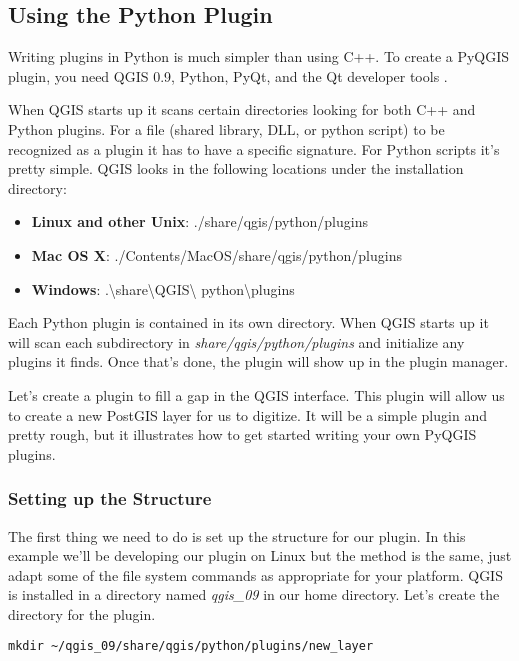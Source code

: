 \subsection{Using the Python Plugin}

Writing plugins in Python is much simpler than using C++. To create a PyQGIS
plugin, you need QGIS 0.9, Python, PyQt, and the Qt developer tools 
\cite{sherman07}.

When QGIS starts up it scans certain directories looking for both C++ and
Python plugins. For a file (shared library, DLL, or python script) to be
recognized as a plugin it has to have a specific signature. For Python scripts
it's pretty simple. QGIS looks in the following locations under the
installation directory:

\begin{itemize}
\item \textbf{Linux and other Unix}: ./share/qgis/python/plugins
\item \textbf{Mac OS X}: ./Contents/MacOS/share/qgis/python/plugins
\item \textbf{Windows}: .\textbackslash share\textbackslash QGIS\textbackslash
python\textbackslash plugins
\end{itemize}

Each Python plugin is contained in its own directory. When QGIS starts up it will
scan each subdirectory in \textsl{share/qgis/python/plugins} and initialize
any plugins it finds. Once that's done, the plugin will show up in the plugin
manager.  

Let's create a plugin to fill a gap in the QGIS interface. This plugin will
allow us to create a new PostGIS layer for us to digitize. It will be a
simple plugin and pretty rough, but it illustrates how to get started
writing your own PyQGIS plugins.

\subsubsection{Setting up the Structure}
The first thing we need to do is set up the structure for our plugin. In
this example we'll be developing our plugin on Linux but the method is
the same, just adapt some of the file system commands as appropriate for
your platform. QGIS is installed in a directory named
\textsl{qgis\_09} in our home directory. Let's create the directory for 
the plugin.

\begin{verbatim}
mkdir ~/qgis_09/share/qgis/python/plugins/new_layer
\end{verbatim}


